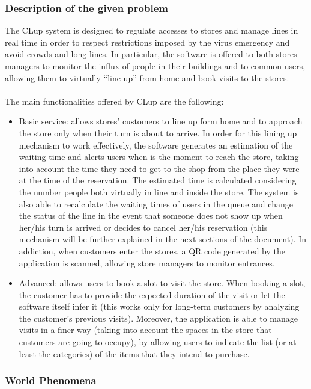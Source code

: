 \documentclass{article}
\begin{document}
\subsubsection{Description of the given problem}
The CLup system is designed to regulate accesses to stores and manage lines in real time in order to respect restrictions imposed by the virus emergency and avoid crowds and long lines. In particular, the software is offered to both stores managers to monitor the influx of people in their buildings and to common users, allowing them to virtually “line-up” from home and book visits to the stores.\\
\smallskip\\
The main functionalities offered by CLup are the following:\\
\begin{itemize}
\item Basic service: allows stores' customers to line up form home and to approach the store only when their turn is about to arrive. In order for this lining up mechanism to work effectively, the software generates an estimation of the waiting time and alerts users when is the moment to reach the store, taking into account the time they need to get to the shop from the place they were at the time of the reservation. The estimated time is calculated considering the number people both virtually in line and inside the store. The system is also able to recalculate the waiting times of users in the queue and change the status of the line in the event that someone does not show up when her/his turn is arrived or decides to cancel her/his reservation (this mechanism will be further explained in the next sections of the document). In addiction, when customers enter the stores, a QR code generated by the application is scanned, allowing store managers to monitor entrances.
\item Advanced: allows users to book a slot to visit the store. When booking a slot, the customer has to provide the expected duration of the visit or let the software itself infer it (this works only for long-term customers by analyzing the customer’s previous visits). Moreover, the application is able to manage visits in a finer way (taking into account the spaces in the store that customers are going to occupy), by allowing users to indicate the list (or at least the categories) of the items that they intend to purchase.
\end{itemize}
\subsubsection{World Phenomena}
\end{document}
